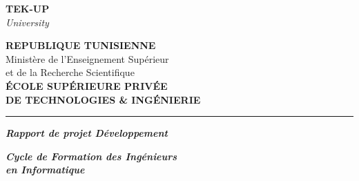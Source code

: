 \documentclass[12pt,a4paper]{report}
\begin{document}
\begin{titlepage}

    \noindent
    \begin{minipage}[t]{0.30\textwidth}
        \vspace{0pt}
        \raggedright
        {\fontsize{16}{18}\selectfont\bfseries \textcolor{blue!80!black}{TEK-UP}}\\[2pt]
        {\small\itshape University}
    \end{minipage}%
    \hfill
    \begin{minipage}[t]{0.60\textwidth}
        \vspace{0pt}
        \raggedleft
        {\normalsize\textbf{REPUBLIQUE TUNISIENNE}}\\[2pt]
        {\small Minist\`ere de l'Enseignement Sup\'erieur}\\
        {\small et de la Recherche Scientifique}\\[4pt]
        {\small\textbf{\'ECOLE SUP\'ERIEURE PRIV\'EE}}\\
        {\small\textbf{DE TECHNOLOGIES \& ING\'ENIERIE}}
    \end{minipage}

    \vspace{0.8cm}

    \noindent\rule{\textwidth}{0.8pt}

    \vspace{2.0cm}

    \begin{center}
        {\LARGE\bfseries\itshape Rapport de projet D\'eveloppement}
    \end{center}

    \vspace{1.8cm}

    \begin{center}
        {\Large\bfseries\itshape Cycle de Formation des Ing\'enieurs\\[4pt]
        en Informatique}
    \end{center}


\end{titlepage}
\end{document}

